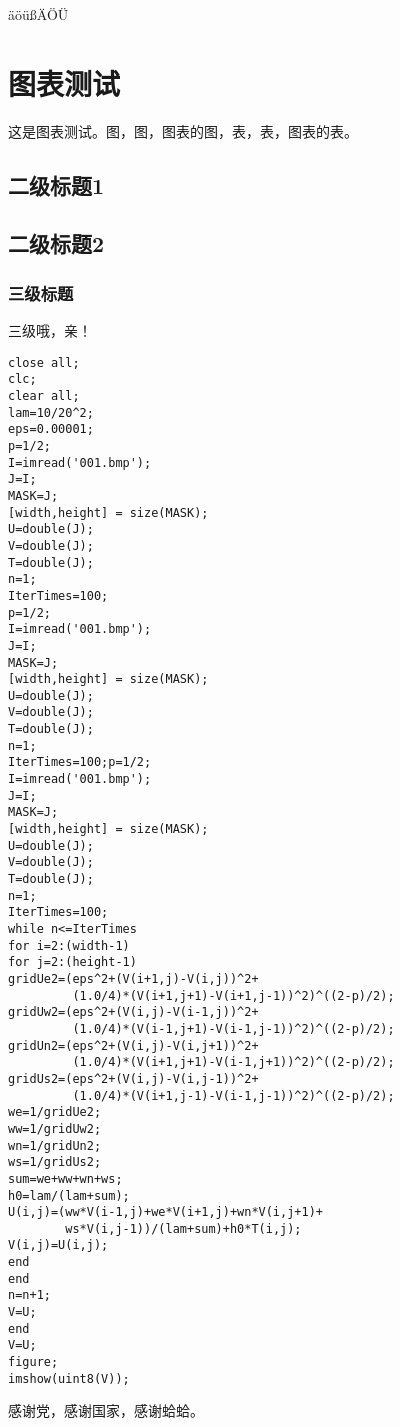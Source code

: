 \documentclass[%
               print, 
              ]{xjtubsc}
\begin{document}
äöüßÄÖÜ

\section{图表测试}
这是图表测试。图，图，图表的图，表，表，图表的表。
\subsection{二级标题1}
\subsection{二级标题2}
\subsubsection{三级标题}
三级哦，亲！



\backmatter





\begin{lstlisting}
close all;
clc;
clear all;
lam=10/20^2;
eps=0.00001;
p=1/2;
I=imread('001.bmp');
J=I;
MASK=J;
[width,height] = size(MASK);
U=double(J);
V=double(J);
T=double(J);
n=1;
IterTimes=100;
p=1/2;
I=imread('001.bmp');
J=I;
MASK=J;
[width,height] = size(MASK);
U=double(J);
V=double(J);
T=double(J);
n=1;
IterTimes=100;p=1/2;
I=imread('001.bmp');
J=I;
MASK=J;
[width,height] = size(MASK);
U=double(J);
V=double(J);
T=double(J);
n=1;
IterTimes=100;
while n<=IterTimes
for i=2:(width-1)
for j=2:(height-1)
gridUe2=(eps^2+(V(i+1,j)-V(i,j))^2+
         (1.0/4)*(V(i+1,j+1)-V(i+1,j-1))^2)^((2-p)/2);
gridUw2=(eps^2+(V(i,j)-V(i-1,j))^2+
         (1.0/4)*(V(i-1,j+1)-V(i-1,j-1))^2)^((2-p)/2);
gridUn2=(eps^2+(V(i,j)-V(i,j+1))^2+
         (1.0/4)*(V(i+1,j+1)-V(i-1,j+1))^2)^((2-p)/2);
gridUs2=(eps^2+(V(i,j)-V(i,j-1))^2+
         (1.0/4)*(V(i+1,j-1)-V(i-1,j-1))^2)^((2-p)/2);
we=1/gridUe2;
ww=1/gridUw2;
wn=1/gridUn2;
ws=1/gridUs2;
sum=we+ww+wn+ws;
h0=lam/(lam+sum);
U(i,j)=(ww*V(i-1,j)+we*V(i+1,j)+wn*V(i,j+1)+
		ws*V(i,j-1))/(lam+sum)+h0*T(i,j);
V(i,j)=U(i,j);
end
end
n=n+1;
V=U;
end
V=U;
figure;
imshow(uint8(V));
\end{lstlisting}

\blindmathpaper
\blindmathpaper
{}



\begin{acknowledgment}
感谢党，感谢国家，感谢蛤蛤。
\end{acknowledgment}
\end{document}
